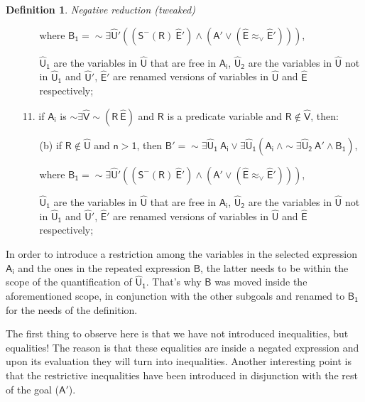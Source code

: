 \documentclass[inscr,ack,preface]{dithesis}
\theoremstyle{definition}
\newtheorem{definition}{Definition}[]
\newcommand{\msf}[1]{$\mathsf{#1}$}
\begin{document}
\begin{definition}{\emph{Negative reduction (tweaked)}}
\begin{enumerate}
\begin{enumerate}
                where \msf{B_{1} = \sim\exists \widehat{U}' \left( \left( S^{-}\left( R \right) ~\widehat{E}' \right) \land \left( A' \lor \left( \widehat{E} \approx_{\lor} \widehat{E}' \right) \right) \right)},

                \msf{\widehat{U}_1} are the variables in \msf{\widehat{U}} that are free in \msf{A_i}, \msf{\widehat{U}_2} are the variables in \msf{\widehat{U}} not in \msf{\widehat{U}_1} and \msf{\widehat{U}'}, \msf{\widehat{E}'} are renamed versions of variables in \msf{\widehat{U}} and \msf{\widehat{E}} respectively;
        \end{enumerate}
  \item[11.] if \msf{A_i} is \msf{\sim \exists \widehat{V} \sim \left( R ~ \widehat{E} \right)} and \msf{R} is a predicate variable and \msf{R \not\in \widehat{V}}, then:
        \begin{enumerate}
          \item[(b)] if \msf{R \not\in \widehat{U}} and \msf{n > 1},
                then \msf{B' = \sim \exists \widehat{U}_1 ~ A_i \lor \exists \widehat{U}_1 \left( A_i ~ \land \sim \exists \widehat{U}_2 ~ A' \land B_{1} \right)},

                where \msf{B_{1} = \sim\exists \widehat{U}' \left( \left( S^{-}\left( R \right) ~\widehat{E}' \right) \land \left( A' \lor \left( \widehat{E} \approx_{\lor} \widehat{E}' \right) \right) \right)},

                \msf{\widehat{U}_1} are the variables in \msf{\widehat{U}} that are free in \msf{A_i}, \msf{\widehat{U}_2} are the variables in \msf{\widehat{U}} not in \msf{\widehat{U}_1} and \msf{\widehat{U}'}, \msf{\widehat{E}'} are renamed versions of variables in \msf{\widehat{U}} and \msf{\widehat{E}} respectively;
        \end{enumerate}
\end{enumerate}
\end{definition}

In order to introduce a restriction among the variables in the selected expression \msf{A_i} and the ones in the repeated expression \msf{B}, the latter needs to be within the scope of the quantification of \msf{\widehat{U}_1}. That's why \msf{B} was moved inside the aforementioned scope, in conjunction with the other subgoals and renamed to \msf{B_1} for the needs of the definition.

The first thing to observe here is that we have not introduced inequalities, but equalities! The reason is that these equalities are inside a negated expression and upon its evaluation they will turn into inequalities. Another interesting point is that the restrictive inequalities have been introduced in disjunction with the rest of the goal (\msf{A'}).
\end{document}
